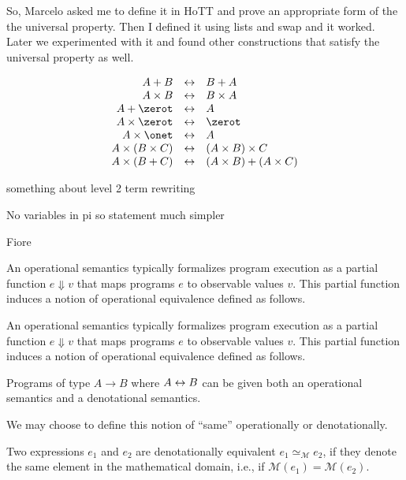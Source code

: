 So, Marcelo asked me to define it in HoTT and prove an appropriate form
of the the universal property. Then I defined it using lists and swap
and it worked. Later we experimented with it and found other
constructions that satisfy the universal property as well.



\[\begin{array}{rcl}
    A \sumt B &\isot& B \sumt A \\
    A \prodt B &\isot& B \prodt A \\
    A \sumt \zerot &\isot& A \\
    A \prodt \zerot &\isot& \zerot \\
    A \prodt \onet &\isot& A \\
    A \prodt (B \prodt C) &\isot& (A \prodt B) \prodt C \\
    A \prodt (B \sumt C) &\isot& (A \prodt B) \sumt (A \prodt C)
  \end{array}\]

something about level 2 term rewriting


No variables in pi so statement much simpler

Fiore


An operational semantics typically formalizes
program execution as a partial function $e \Downarrow v$ that maps programs $e$
to observable values $v$. This partial function induces a notion of operational
equivalence defined as follows.



An operational semantics typically formalizes
program execution as a partial function $e \Downarrow v$ that maps programs $e$
to observable values $v$. This partial function induces a notion of operational
equivalence defined as follows.



Programs of type $A \rightarrow B$ where $A \leftrightarrow B$ can be given both an
operational semantics and a denotational semantics.


We may choose to define this notion of ``same'' operationally or
denotationally.


\begin{definition}
  Two expressions $e_1$ and $e_2$ are denotationally equivalent
  $e_1 \simeq_{\mathcal{M}} e_2$, if they denote the same element in the
  mathematical domain, i.e., if $\mathcal{M}(e_1) = \mathcal{M}(e_2)$.
\end{definition}

